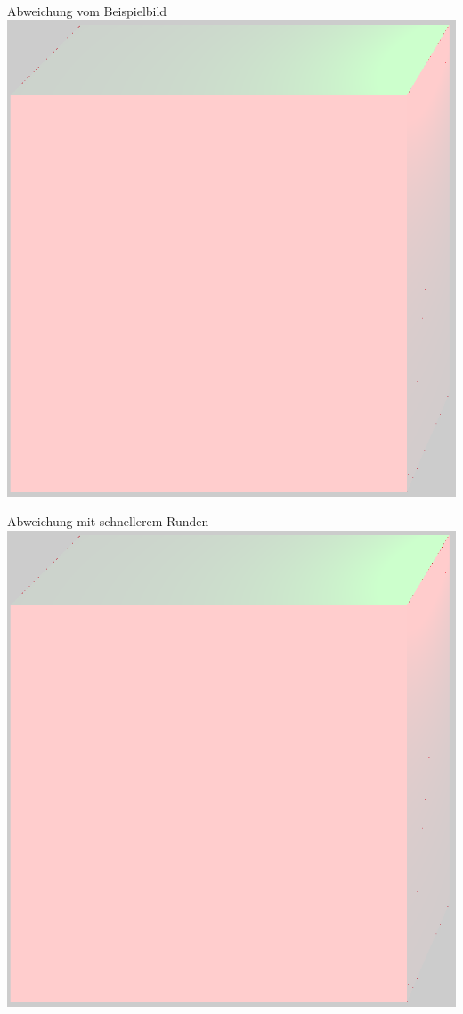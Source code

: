 	\begin{frame}{Abweichung vom Beispielbild}
		\center
		\includegraphics[height=0.8\textheight]{images/cropped_diff_ref.png}
	\end{frame}
	\begin{frame}{Abweichung mit schnellerem Runden}
		\center
		\includegraphics[height=0.8\textheight]{images/cropped_diff_round.png}
	\end{frame}
